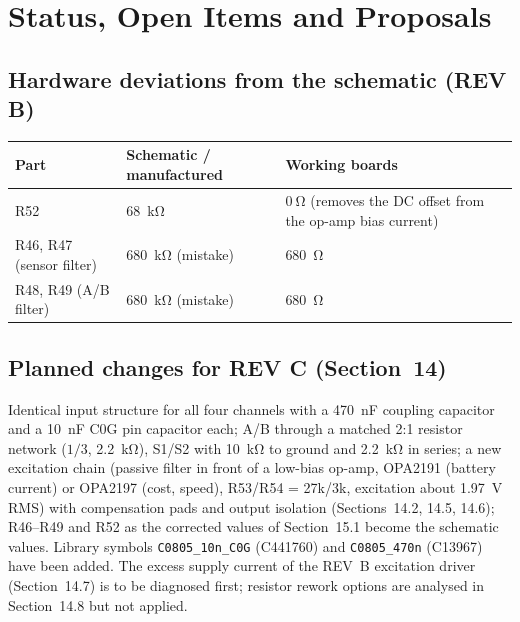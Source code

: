 \documentclass[11pt,a4paper]{article}
\begin{document}
\section{Status, Open Items and Proposals}

\subsection{Hardware deviations from the schematic (REV B)}

\begin{center}
\small
\begin{tabular}{@{}lll@{}}
\toprule
Part & Schematic / manufactured & Working boards \\
\midrule
R52 & \SI{68}{\kilo\ohm} & $\SI{0}{\ohm}$ (removes the DC offset from the op-amp bias current) \\
R46, R47 (sensor filter) & \SI{680}{\kilo\ohm} (mistake) & \SI{680}{\ohm} \\
R48, R49 (A/B filter)    & \SI{680}{\kilo\ohm} (mistake) & \SI{680}{\ohm} \\
\bottomrule
\end{tabular}
\end{center}

\subsection{Planned changes for REV C (Section~14)}

Identical input structure for all four channels with a \SI{470}{\nano\farad} coupling
capacitor and a \SI{10}{\nano\farad} C0G pin capacitor each; A/B through a matched 2:1
resistor network ($1/3$, \SI{2.2}{\kilo\ohm}), S1/S2 with \SI{10}{\kilo\ohm} to ground and
\SI{2.2}{\kilo\ohm} in series; a new excitation chain (passive filter in front of a
low-bias op-amp, OPA2191 (battery current) or OPA2197 (cost, speed), R53/R54 = 27k/3k, excitation about \SI{1.97}{\volt} RMS) with
compensation pads and output isolation (Sections~14.2, 14.5, 14.6); R46--R49 and R52 as the
corrected values of Section~15.1 become the schematic values.  Library symbols
\texttt{C0805\_10n\_C0G} (C441760) and \texttt{C0805\_470n} (C13967) have been added.  The
excess supply current of the REV~B excitation driver (Section~14.7) is to be diagnosed first;
resistor rework options are analysed in Section~14.8 but not applied.
\end{document}
